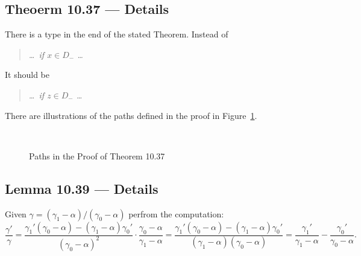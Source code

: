\subsection{Theoerm 10.37 --- Details}

There is a type in the end of the stated Theorem.
Instead of
\begin{quote}
\textsl{\ldots\ if \(x\in D_-\) \ldots}
\end{quote}
It should be
\begin{quote}
\textsl{\ldots\ if \(z\in D_-\) \ldots}
\end{quote}

There are illustrations of the paths defined in the proof 
in Figure~\ref{fig:10-37}.
\begin{figure}[ht] \label{fig:10-37} %
%
%
\hspace{0.1\textwidth}
%
%
\\[20pt]%
%
%
\hspace{0.1\textwidth}
%
%
\caption{Paths in the Proof of Theorem 10.37}
\end{figure}


\subsection{Lemma 10.39 --- Details}

Given \(\gamma = (\gamma_1 - \alpha) / (\gamma_0 - \alpha)\)
perfrom the computation:
\begin{equation*}
\frac{\gamma'}{\gamma}
= \frac{\gamma_1'(\gamma_0-\alpha) - (\gamma_1-\alpha)\gamma_0'}{
               (\gamma_0 - \alpha)^2}
   \cdot \frac{\gamma_0 - \alpha}{\gamma_1 - \alpha}
= \frac{\gamma_1'(\gamma_0-\alpha) - (\gamma_1-\alpha)\gamma_0'}{
               (\gamma_1 - \alpha)(\gamma_0 - \alpha)}
= \frac{\gamma_1'}{\gamma_1-\alpha} - \frac{\gamma_0'}{\gamma_0-\alpha}.
\end{equation*}

